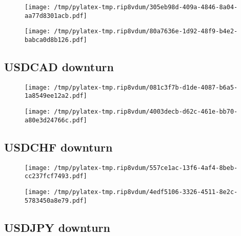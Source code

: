 \documentclass{article}%
\begin{document}
\begin{figure}[htbp]%
\centering%
\texttt{[image: /tmp/pylatex-tmp.rip8vdum/305eb98d-409a-4846-8a04-aa77d8301acb.pdf]}%
\end{figure}

%


\begin{figure}[htbp]%
\centering%
\texttt{[image: /tmp/pylatex-tmp.rip8vdum/80a7636e-1d92-48f9-b4e2-babca0d8b126.pdf]}%
\end{figure}

%
\newpage %
\subsection{USDCAD downturn}%
\label{subsec:USDCADdownturn}%


\begin{figure}[htbp]%
\centering%
\texttt{[image: /tmp/pylatex-tmp.rip8vdum/081c3f7b-d1de-4087-b6a5-1a8549ee12a2.pdf]}%
\end{figure}

%


\begin{figure}[htbp]%
\centering%
\texttt{[image: /tmp/pylatex-tmp.rip8vdum/4003decb-d62c-461e-bb70-a80e3d24766c.pdf]}%
\end{figure}

%
\newpage %
\subsection{USDCHF downturn}%
\label{subsec:USDCHFdownturn}%


\begin{figure}[htbp]%
\centering%
\texttt{[image: /tmp/pylatex-tmp.rip8vdum/557ce1ac-13f6-4af4-8beb-cc237fcf7493.pdf]}%
\end{figure}

%


\begin{figure}[htbp]%
\centering%
\texttt{[image: /tmp/pylatex-tmp.rip8vdum/4edf5106-3326-4511-8e2c-5783450a8e79.pdf]}%
\end{figure}

%
\newpage %
\subsection{USDJPY downturn}%
\label{subsec:USDJPYdownturn}%
\end{document}
